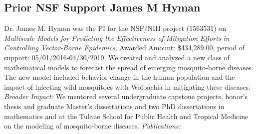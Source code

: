 \documentclass[11pt]{NSFamsart}
\begin{document}
\subsection{Prior NSF Support James M Hyman} \label{sec:prior}
\vspace{0.1cm}
Dr. James M. Hyman was the PI for the NSF/NIH project (1563531) on \textit{Multiscale Models for Predicting the Effectiveness of Mitigation Efforts in Controlling Vector-Borne Epidemics}, Awarded Amount: \$434,289.00,  period of support: 05/01/2016-04/30/2019.  
We created and analyzed a new class of mathematical models to forecast the spread of emerging mosquito-borne diseases.  The new model included behavior change in the human population and the impact of infecting wild mosquitoes with Wolbachia in mitigating these diseases. 
\textit{ Broader Impact:}   We mentored several undergraduate capstone projects, honor's thesis and graduate Master's dissertations and two PhD dissertations in mathematics and at the Tulane School for Public Health and Tropical Medicine on the modeling of mosquito-borne diseases. 
\textit{ Publications:} \cite{xue2016two,xue2018comparing,qu2018modeling,moran2016epidemic,chowell2016mathematical,margevicius2016biosurveillance}

\newpage
\clearpage
\setcounter{page}{1}




{\renewcommand\addcontentsline[3]{} 
\renewcommand{\refname}{{\Large\textbf{References Cited}}} %
\renewcommand{\bibliofont}{\normalsize}

}
\end{document}
